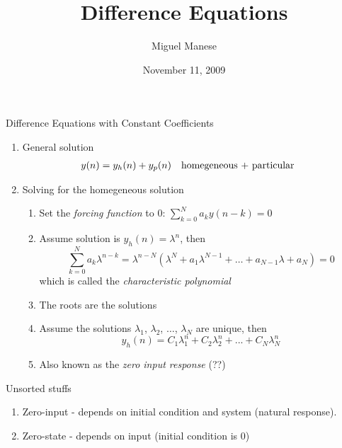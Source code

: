 \documentclass{article}
\title{Difference Equations}
\author{Miguel Manese}
\date{November 11, 2009}
\begin{document}
\maketitle

\begin{section}{Difference Equations with Constant Coefficients}
\begin{enumerate}
\item General solution
  \begin{align}
  y(n) &= y_h(n) + y_p(n) && \text{homegeneous + particular}\notag
  \end{align}
\item Solving for the homegeneous solution
  \begin{enumerate}
  \item Set the \emph{forcing function} to 0: $\sum_{k=0}^N a_k y(n-k) = 0$
  \item Assume solution is $y_h(n) = \lambda^n$, then
   \[ \sum_{k=0}^N a_k \lambda^{n-k} = \lambda^{n-N} 
      (\lambda^N + a_1 \lambda^{N-1} + \ldots + a_{N-1} \lambda + a_N) = 0 \]
  \noindent which is called the \emph{characteristic polynomial}
  \item The roots are the solutions
  \item Assume the solutions $\lambda_1$, $\lambda_2$, $\ldots$, $\lambda_N$
  are unique, then
   \[ y_h(n) = C_1\lambda_1^n + C_2\lambda_2^n + ... + C_N\lambda_N^n \]
  \item Also known as the \emph{zero input response}  (??)
  \end{enumerate}
\end{enumerate}

Unsorted stuffs
\begin{enumerate}
\item Zero-input - depends on initial condition and system (natural response).
\item Zero-state - depends on input (initial condition is 0)
\end{enumerate}
\end{section}
\end{document}
